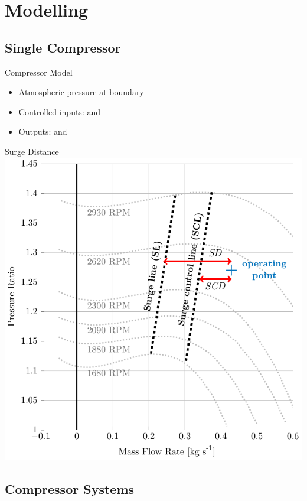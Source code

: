 \section{Modelling}

\subsection{Single Compressor}
\begin{frame}{Compressor Model}
  \begin{minipage}{0.6\linewidth}
    \resizebox{\linewidth}{!}{
      \begin{tikzpicture}
        \drawcomp
      \end{tikzpicture}
    }
  \end{minipage}
  \begin{minipage}{0.38\linewidth}
  \begin{itemize}
    \item Atmospheric pressure at boundary
    \item Controlled inputs:  and 
    \item Outputs:  and 
  \end{itemize}
\end{minipage}
\end{frame}

\begin{frame}{Surge Distance}
    \centering
    \includegraphics[width=.5\linewidth]{figures/surge.pdf}
\end{frame}

\subsection{Compressor Systems}

